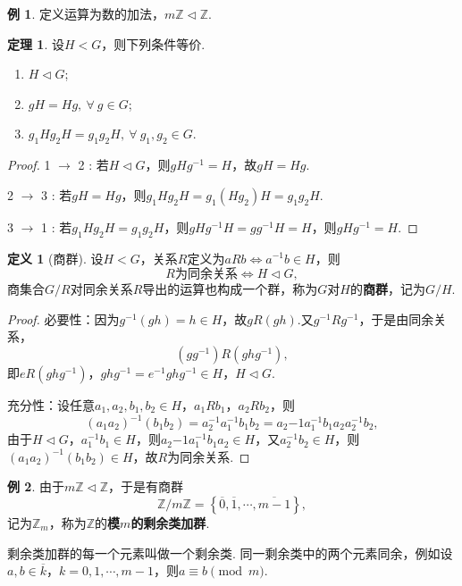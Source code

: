 \documentclass[12pt]{ctexart}
\theoremstyle{definition}
\newtheorem{definition}{定义}
\newtheorem{theorem}{定理}
\newtheorem{example}{例}
\theoremstyle{plain}
\begin{document}
	\begin{example}
		定义运算为数的加法，$m\mathbb{Z}\vartriangleleft \mathbb{Z}$.
	\end{example}
	\begin{theorem}
		设$H<G$，则下列条件等价.
		\begin{enumerate}
			\item $H\vartriangleleft G$;
			\item $gH=Hg,\ \forall\ g\in G$;
			\item $g_1Hg_2H=g_1g_2H,\ \forall\ g_1,g_2\in G$.
		\end{enumerate}
	\end{theorem}
	\begin{proof}
		1 $\to$ 2 : 若$H\vartriangleleft G$，则$gHg^{-1}=H$，故$gH=Hg$.
		
		2 $\to$ 3 : 若$gH=Hg$，则$g_1Hg_2H=g_1(Hg_2)H=g_1g_2H$.
		
		3 $\to$ 1 : 若$g_1Hg_2H=g_1g_2H$，则$gHg^{-1}H=gg^{-1}H=H$，则$gHg^{-1}=H$.
	\end{proof}
	\begin{definition}[商群]
		设$H<G$，关系$R$定义为$aRb\iff a^{-1}b\in H$，则
		$$R\text{为同余关系}\iff H\vartriangleleft G,$$
		商集合$G/R$对同余关系$R$导出的运算也构成一个群，称为$G$对$H$的\textbf{商群}，记为$G/H$.
	\end{definition}
	\begin{proof}
		必要性：因为$g^{-1}(gh)=h\in H$，故$gR(gh)$.又$g^{-1}Rg^{-1}$，于是由同余关系，$$(gg^{-1})R(ghg^{-1}),$$即$eR(ghg^{-1})$，$ghg^{-1}=e^{-1}ghg^{-1}\in H$，$H\vartriangleleft G$.
		
		充分性：设任意$a_1,a_2,b_1,b_2\in H$，$a_1Rb_1$，$a_2Rb_2$，则
		$$(a_1a_2)^{-1}(b_1b_2)=a_2^{-1}a_1^{-1}b_1b_2=a_2{-1}a_1^{-1}b_1a_2a_2^{-1}b_2,$$
		由于$H\vartriangleleft G$，$a_1^{-1}b_1\in H$，则$a_2{-1}a_1^{-1}b_1a_2\in H$，又$a_2^{-1}b_2\in H$，则$(a_1a_2)^{-1}(b_1b_2)\in H$，故$R$为同余关系.
	\end{proof}
	\begin{example}
		由于$m\mathbb{Z}\vartriangleleft\mathbb{Z}$，于是有商群
		$$\mathbb{Z}/m\mathbb{Z}=\left\{\overline{0},\overline{1},\cdots,\overline{m-1}\right\},$$
		记为$\mathbb{Z}_m$，称为$\mathbb{Z}$的\textbf{模$m$的剩余类加群}.
	\end{example}
	剩余类加群的每一个元素叫做一个剩余类. 同一剩余类中的两个元素同余，例如设$a,b\in\overline{k}$，$k=0,1,\cdots,m-1$，则$a\equiv b\pmod m$. 
\end{document}
